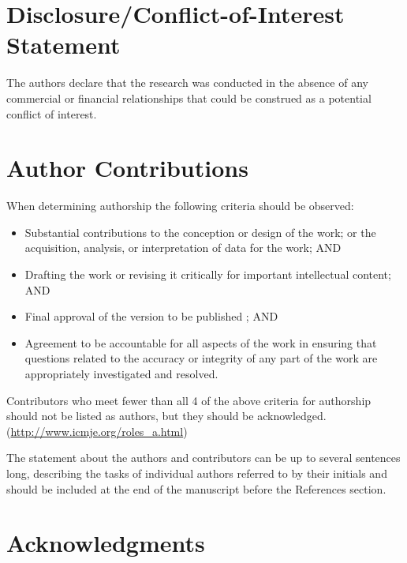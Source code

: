 \documentclass[]{article}
\providecommand{\tightlist}{%
  \setlength{\itemsep}{0pt}\setlength{\parskip}{0pt}}
\begin{document}
\hypertarget{disclosureconflict-of-interest-statement}{%
\section*{Disclosure/Conflict-of-Interest Statement}\label{disclosureconflict-of-interest-statement}}

The authors declare that the research was conducted in the absence of any
commercial or financial relationships that could be construed as a potential
conflict of interest.

\hypertarget{author-contributions}{%
\section*{Author Contributions}\label{author-contributions}}

When determining authorship the following criteria should be observed:

\begin{itemize}
\tightlist
\item
  Substantial contributions to the conception or design of the work; or the
  acquisition, analysis, or interpretation of data for the work; AND
\item
  Drafting the work or revising it critically for important intellectual
  content; AND
\item
  Final approval of the version to be published ; AND
\item
  Agreement to be accountable for all aspects of the work in ensuring that
  questions related to the accuracy or integrity of any part of the work are
  appropriately investigated and resolved.
\end{itemize}

Contributors who meet fewer than all 4 of the above criteria for authorship
should not be listed as authors, but they should be acknowledged.
(\url{http://www.icmje.org/roles_a.html})

The statement about the authors and contributors can be up to several sentences
long, describing the tasks of individual authors referred to by their initials
and should be included at the end of the manuscript before the References
section.

\hypertarget{acknowledgments}{%
\section*{Acknowledgments}\label{acknowledgments}}
\end{document}
